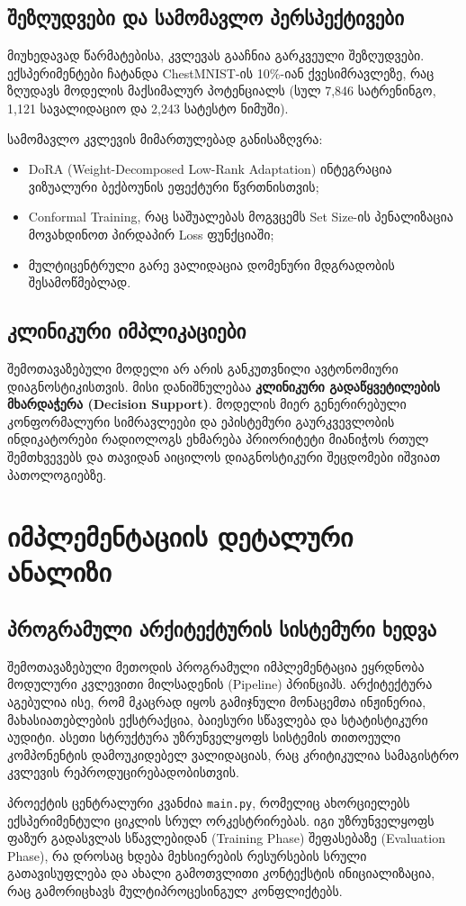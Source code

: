 \documentclass[12pt,a4paper,oneside]{report}
\begin{document}
\section{შეზღუდვები და სამომავლო პერსპექტივები}
მიუხედავად წარმატებისა, კვლევას გააჩნია გარკვეული შეზღუდვები. ექსპერიმენტები ჩატანდა ChestMNIST-ის 10\%-იან ქვესიმრავლეზე, რაც ზღუდავს მოდელის მაქსიმალურ პოტენციალს (სულ 7,846 სატრენინგო, 1,121 სავალიდაციო და 2,243 სატესტო ნიმუში).

სამომავლო კვლევის მიმართულებად განისაზღვრა:
\begin{itemize}
\item DoRA (Weight-Decomposed Low-Rank Adaptation) ინტეგრაცია ვიზუალური ბექბოუნის ეფექტური წვრთნისთვის;
\item Conformal Training, რაც საშუალებას მოგვცემს Set Size-ის პენალიზაცია მოვახდინოთ პირდაპირ Loss ფუნქციაში;
\item მულტიცენტრული გარე ვალიდაცია დომენური მდგრადობის შესამოწმებლად.
\end{itemize}

\section{კლინიკური იმპლიკაციები}
შემოთავაზებული მოდელი არ არის განკუთვნილი ავტონომიური დიაგნოსტიკისთვის. მისი დანიშნულებაა \textbf{კლინიკური გადაწყვეტილების მხარდაჭერა (Decision Support)}. მოდელის მიერ გენერირებული კონფორმალური სიმრავლეები და ეპისტემური გაურკვევლობის ინდიკატორები რადიოლოგს ეხმარება პრიორიტეტი მიანიჭოს რთულ შემთხვევებს და თავიდან აიცილოს დიაგნოსტიკური შეცდომები იშვიათ პათოლოგიებზე.

\chapter{იმპლემენტაციის დეტალური ანალიზი}

\section{პროგრამული არქიტექტურის სისტემური ხედვა}
შემოთავაზებული მეთოდის პროგრამული იმპლემენტაცია ეყრდნობა მოდულური კვლევითი მილსადენის (Pipeline) პრინციპს. არქიტექტურა აგებულია ისე, რომ მკაცრად იყოს გამიჯნული მონაცემთა ინჟინერია, მახასიათებლების ექსტრაქცია, ბაიესური სწავლება და სტატისტიკური აუდიტი. ასეთი სტრუქტურა უზრუნველყოფს სისტემის თითოეული კომპონენტის დამოუკიდებელ ვალიდაციას, რაც კრიტიკულია სამაგისტრო კვლევის რეპროდუცირებადობისთვის.

პროექტის ცენტრალური კვანძია \texttt{main.py}, რომელიც ახორციელებს ექსპერიმენტული ციკლის სრულ ორკესტრირებას. იგი უზრუნველყოფს ფაზურ გადასვლას სწავლებიდან (Training Phase) შეფასებაზე (Evaluation Phase), რა დროსაც ხდება მეხსიერების რესურსების სრული გათავისუფლება და ახალი გამოთვლითი კონტექსტის ინიციალიზაცია, რაც გამორიცხავს მულტიპროცესინგულ კონფლიქტებს.
\end{document}
